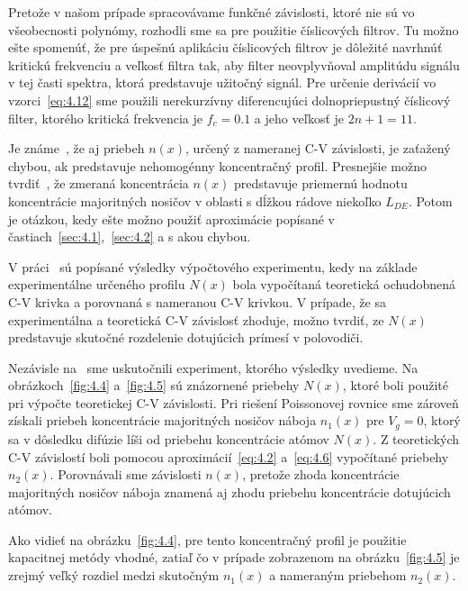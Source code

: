 \par Pretože v našom prípade spracovávame funkčné závislosti, ktoré
nie sú vo všeobecnosti polynómy, rozhodli sme sa pre použitie
číslicových filtrov. Tu možno ešte spomenúť, že pre úspešnú aplikáciu
číslicových filtrov je dôležité navrhnúť kritickú frekvenciu a veľkosť
filtra tak, aby filter neovplyvňoval amplitúdu signálu v tej časti
spektra, ktorá predstavuje užitočný signál. Pre určenie derivácií vo
vzorci~\ref{eq:4.12} sme použili nerekurzívny diferencujúci
dolnopriepustný číslicový filter, ktorého kritická frekvencia je
$f_{c}=0.1$ a jeho veľkosť je $2n+1=11$.

\par Je známe~\cite{4.18}, že aj priebeh $n(x)$, určený z nameranej
C-V závislosti, je zaťažený chybou, ak predstavuje nehomogénny
koncentračný profil. Presnejšie možno tvrdiť~\cite{4.3}, že zmeraná
koncentrácia $n(x)$ predstavuje priemernú hodnotu koncentrácie
majoritných nosičov v oblasti s dĺžkou rádove niekoľko $L_{DE}$. Potom
je otázkou, kedy ešte možno použiť aproximácie popísané v
častiach~\ref{sec:4.1},~\ref{sec:4.2} a s akou chybou.

\par V práci~\cite{4.22} sú popísané výsledky výpočtového experimentu,
kedy na základe experimentálne určeného profilu $N(x)$ bola vypočítaná
teoretická ochudobnená C-V krivka a porovnaná s nameranou C-V
krivkou. V prípade, že sa experimentálna a teoretická C-V závislosť
zhoduje, možno tvrdiť, ze $N(x)$ predstavuje skutočné rozdelenie
dotujúcich prímesí v polovodiči.

\par Nezávisle na~\cite{4.22} sme uskutočnili experiment, ktorého
výsledky uvedieme. Na obrázkoch~\ref{fig:4.4} a~\ref{fig:4.5} sú
znázornené priebehy $N(x)$, ktoré boli použité pri výpočte teoretickej
C-V závislosti. Pri riešení Poissonovej rovnice sme zároveň získali
priebeh koncentrácie majoritných nosičov náboja $n_{1}(x)$ pre
$V_{g}=0$, ktorý sa v dôsledku difúzie líši od priebehu koncentrácie
atómov $N(x)$. Z teoretických C-V závislostí boli pomocou
aproximácií~\ref{eq:4.2} a~\ref{eq:4.6} vypočítané priebehy
$n_{2}(x)$.  Porovnávali sme závislosti $n(x)$, pretože zhoda
koncentrácie majoritných nosičov náboja znamená aj zhodu priebehu
koncentrácie dotujúcich atómov.

\par Ako vidieť na obrázku~\ref{fig:4.4}, pre tento koncentračný
profil je použitie kapacitnej metódy vhodné, zatiaľ čo v prípade
zobrazenom na obrázku~\ref{fig:4.5} je zrejmý veľký rozdiel medzi
skutočným $n_{1}(x)$ a nameraným priebehom $n_{2}(x)$.


